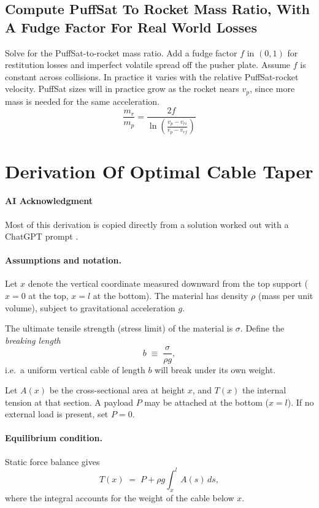 \documentclass{article}
\begin{document}
\subsection{Compute PuffSat To Rocket Mass Ratio, With A Fudge Factor For Real World Losses}

Solve for the PuffSat-to-rocket mass ratio. Add a fudge factor $f$ in $(0,1)$ for restitution losses and imperfect volatile spread off the pusher plate. Assume $f$ is constant across collisions. In practice it varies with the relative PuffSat-rocket velocity. PuffSat sizes will in practice grow as the rocket nears $v_p$, since more mass is needed for the same acceleration.
\begin{equation}
\frac{m_r}{m_p} = \frac{2f}{\ln\left(\frac{v_p-v_{ri}}{v_p-v_{rf}}\right)}\label{eq:PuffSat_ratio}
\end{equation}

\section{Derivation Of Optimal Cable Taper}\label{sec:breaking_length_derived}

\paragraph{AI Acknowledgment}
Most of this derivation is copied directly from a solution worked out with a ChatGPT prompt \cite{chatgpt}.

\paragraph{Assumptions and notation.} 
Let $x$ denote the vertical coordinate measured downward from the top support ($x=0$ at the top, $x=l$ at the bottom). 
The material has density $\rho$ (mass per unit volume), subject to gravitational acceleration $g$. 

The ultimate tensile strength (stress limit) of the material is $\sigma$. 
Define the \emph{breaking length}
\[
b \;\equiv\; \frac{\sigma}{\rho g},
\]
i.e.\ a uniform vertical cable of length $b$ will break under its own weight. 

Let $A(x)$ be the cross-sectional area at height $x$, and $T(x)$ the internal tension at that section. 
A payload $P$ may be attached at the bottom ($x=l$). If no external load is present, set $P=0$. 

\paragraph{Equilibrium condition.} 
Static force balance gives
\[
T(x) \;=\; P + \rho g \int_x^l A(s)\,ds,
\]
where the integral accounts for the weight of the cable below $x$. 
\end{document}
